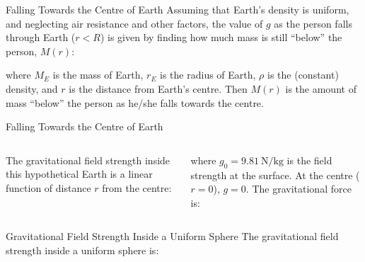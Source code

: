 \documentclass[12pt,compress,aspectratio=169]{beamer}
\begin{document}
\begin{frame}{Falling Towards the Centre of Earth}
  Assuming that Earth's density is uniform, and neglecting air resistance and
  other factors, the value of $g$ as the person falls through Earth ($r<R$) is
  given by finding how much mass is still ``below'' the person, $M(r)$:


  where $M_E$ is the mass of Earth, $r_E$ is the radius of Earth, $\rho$ is the
  (constant) density, and $r$ is the distance from Earth's centre. Then $M(r)$
  is the amount of mass ``below'' the person as he/she falls towards the centre.
\end{frame}



\begin{frame}{Falling Towards the Centre of Earth}
  \begin{columns}

    The gravitational field strength inside this hypothetical Earth is a
    linear function of distance $r$ from the centre:

    
    where $g_0=\SI{9.81}{\newton\per\kilogram}$ is the field strength at the
    surface. At the centre ($r=0$), $g=0$. The gravitational force is:
    
  \end{columns}
\end{frame}



\begin{frame}{Gravitational Field Strength Inside a Uniform Sphere}
  The gravitational field strength inside a uniform sphere is:
  \begin{center}
  \end{center}
\end{frame}
\end{document}
